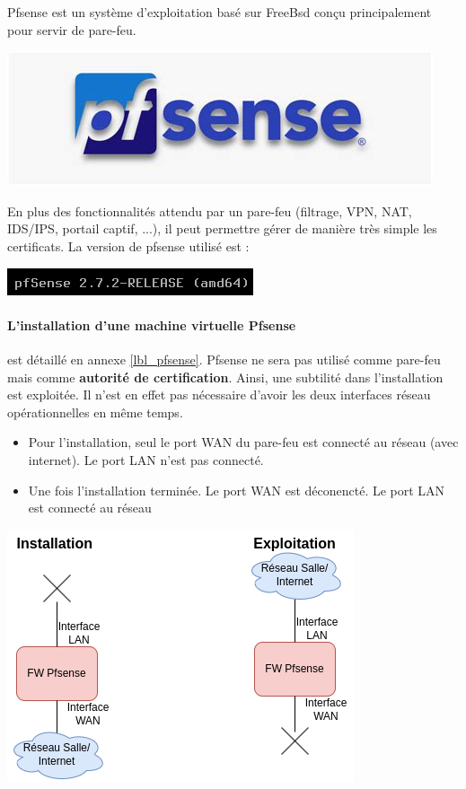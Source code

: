 \documentclass[french, 12pt]{article}%
\newcommand{\itemE}{\item[$\bullet$]}
\begin{document}
Pfsense est un système d'exploitation basé sur FreeBsd conçu principalement pour servir de pare-feu. 

\begin{center}
\includegraphics[scale=0.4]{./ressource/pfsenseLogo}
\end{center}

En plus des fonctionnalités attendu par un pare-feu (filtrage, VPN, NAT, IDS/IPS, portail captif, ...), il peut permettre gérer de manière très simple les certificats. La version de pfsense utilisé est : 
\begin{center}
\includegraphics[scale=0.7]{./ressource/versionPfsense}
\end{center}


\paragraph{L'installation d'une machine virtuelle Pfsense} est détaillé en annexe \ref{lbl_pfsense}.  Pfsense ne sera pas utilisé comme pare-feu mais comme \textbf{autorité de certification}.  Ainsi, une subtilité dans l'installation est exploitée. Il n'est en effet pas nécessaire d'avoir les deux interfaces réseau opérationnelles en même temps. 
\begin{itemize}
\itemE Pour l'installation, seul le port WAN du pare-feu est connecté au réseau (avec internet). Le port LAN n'est pas connecté.
\itemE Une fois l'installation terminée. Le port WAN est déconencté. Le port LAN est connecté au réseau
\end{itemize}

\begin{center}
\includegraphics[scale=0.7]{./ressource/installPfense.png}
\end{center}
\end{document}
